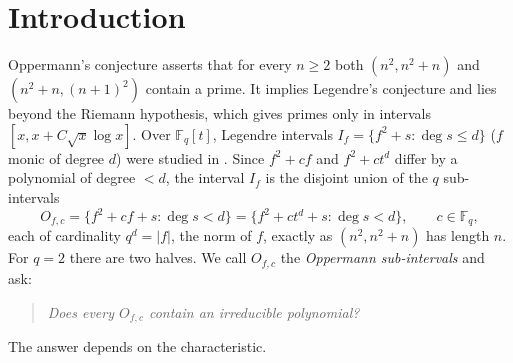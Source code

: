 \documentclass[11pt,a4paper]{amsart}
\theoremstyle{definition}
\theoremstyle{remark}
\newcommand{\F}{\mathbb{F}}
\begin{document}
\maketitle

\section{Introduction}

Oppermann's conjecture \cite{Oppermann} asserts that for every $n\ge2$ both $(n^2,n^2+n)$ and $(n^2+n,(n+1)^2)$
contain a prime. It implies Legendre's conjecture and lies beyond the Riemann hypothesis, which gives primes only
in intervals $[x,x+C\sqrt x\log x]$. Over $\F_q[t]$, Legendre intervals $I_f=\{f^2+s:\deg s\le d\}$ ($f$ monic of
degree $d$) were studied in \cite{ChenI}. Since $f^2+cf$ and $f^2+ct^d$ differ by a polynomial of degree $<d$, the
interval $I_f$ is the disjoint union of the $q$ sub-intervals
\begin{equation}\label{eq:Ofc}
O_{f,c}=\{f^2+cf+s:\deg s<d\}=\{f^2+ct^d+s:\deg s<d\},\qquad c\in\F_q,
\end{equation}
each of cardinality $q^d=|f|$, the norm of $f$, exactly as $(n^2,n^2+n)$ has length $n$. For $q=2$ there are two
halves. We call $O_{f,c}$ the \emph{Oppermann sub-intervals} and ask:

\begin{quote}
\emph{Does every $O_{f,c}$ contain an irreducible polynomial?}
\end{quote}

\noindent The answer depends on the characteristic.
\end{document}
